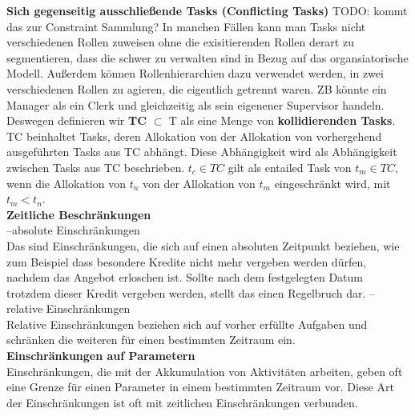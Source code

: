 \textbf{Sich gegenseitig ausschließende Tasks (Conflicting Tasks)}
TODO: kommt das zur Constraint Sammlung?
In manchen Fällen kann man Tasks nicht verschiedenen Rollen zuweisen  ohne die exisitierenden Rollen derart zu segmentieren, dass die schwer zu verwalten sind in Bezug auf das organsiatorische Modell. Außerdem können Rollenhierarchien dazu verwendet werden, in zwei verschiedenen Rollen zu agieren, die eigentlich getrennt waren. ZB könnte ein Manager als ein Clerk und gleichzeitig als sein eigenener Supervisor handeln.\\
Deswegen definieren wir \textbf{TC} $\subset$ T als eine Menge von \textbf{kollidierenden Tasks}. TC beinhaltet Tasks, deren Allokation von der Allokation von vorhergehend ausgeführten Tasks aus TC abhängt. Diese Abhängigkeit wird als Abhängigkeit zwischen Tasks aus TC beschrieben. $t_c\in TC$ gilt als entailed Task von $t_m\in TC$, wenn die Allokation von $t_n$ von der Allokation von $t_m$ eingeschränkt wird, mit $t_m<t_n$.
\cite{wolter_modeling_of_TBAC_in_BPMN}\\

\textbf{Zeitliche Beschränkungen}\\
--absolute Einschränkungen\\
Das sind Einschränkungen, die sich auf einen absoluten Zeitpunkt beziehen, wie zum Beispiel dass besondere Kredite nicht mehr vergeben werden dürfen, nachdem das Angebot erloschen ist. Sollte nach dem festgelegten Datum trotzdem dieser Kredit vergeben werden, stellt das einen Regelbruch dar.
--relative Einschränkungen\\
Relative Einschränkungen beziehen sich auf vorher erfüllte Aufgaben und schränken die weiteren für einen bestimmten Zeitraum ein.\\

\textbf{Einschränkungen auf Parametern}\\
Einschränkungen, die mit der Akkumulation von Aktivitäten arbeiten, geben oft eine Grenze für einen Parameter in einem bestimmten Zeitraum vor. Diese Art der Einschränkungen ist oft mit zeitlichen Einschränkungen verbunden.\\

